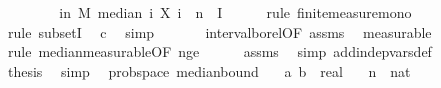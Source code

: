 \begin{isabellebody}
\ \ \isamarkupfalse%
\ \isamarkupfalse%
\ {\isachardoublequoteopen}{\isachardot}{\kern0pt}{\isachardot}{\kern0pt}{\isachardot}{\kern0pt}\ {\isasymle}\ {\isasymP}{\isacharparenleft}{\kern0pt}{\isasymomega}\ in\ M{\isachardot}{\kern0pt}\ median\ {\isacharparenleft}{\kern0pt}{\isasymlambda}i{\isachardot}{\kern0pt}\ X\ i\ {\isasymomega}{\isacharparenright}{\kern0pt}\ n\ {\isasymin}\ I{\isacharparenright}{\kern0pt}{\isachardoublequoteclose}\isanewline
\ \ \ \ \isamarkupfalse%
\ {\isacharparenleft}{\kern0pt}rule\ finite{\isacharunderscore}{\kern0pt}measure{\isacharunderscore}{\kern0pt}mono{\isacharparenright}{\kern0pt}\isanewline
\ \ \ \ \ \isamarkupfalse%
\ {\isacharparenleft}{\kern0pt}rule\ subsetI{\isacharparenright}{\kern0pt}\ \isamarkupfalse%
\ c\ \isamarkupfalse%
\ simp\ \isanewline
\ \ \ \ \isamarkupfalse%
\ interval{\isacharunderscore}{\kern0pt}borel{\isacharbrackleft}{\kern0pt}OF\ assms{\isacharparenleft}{\kern0pt}{}{\isacharparenright}{\kern0pt}{\isacharbrackright}{\kern0pt}\ \isamarkupfalse%
\ measurable\isanewline
\ \ \ \ \isamarkupfalse%
\ {\isacharparenleft}{\kern0pt}rule\ median{\isacharunderscore}{\kern0pt}measurable{\isacharbrackleft}{\kern0pt}OF\ n{\isacharunderscore}{\kern0pt}ge{\isacharunderscore}{\kern0pt}{}{\isacharbrackright}{\kern0pt}{\isacharparenright}{\kern0pt}\isanewline
\ \ \ \ \isamarkupfalse%
\ assms{\isacharparenleft}{\kern0pt}{}{\isacharparenright}{\kern0pt}\ \isamarkupfalse%
\ {\isacharparenleft}{\kern0pt}simp\ add{\isacharcolon}{\kern0pt}indep{\isacharunderscore}{\kern0pt}vars{\isacharunderscore}{\kern0pt}def{\isacharparenright}{\kern0pt}\isanewline
\ \ \isamarkupfalse%
\ \isamarkupfalse%
\ {\isacharquery}{\kern0pt}thesis\ \isamarkupfalse%
\ simp\isanewline
{}\isamarkupfalse%
%
\endisatagproof
{\isafoldproof}%
%
\isadelimproof
\isanewline
%
\endisadelimproof
\isanewline
{}\isamarkupfalse%
\ {\isacharparenleft}{\kern0pt}\ prob{\isacharunderscore}{\kern0pt}space{\isacharparenright}{\kern0pt}\ median{\isacharunderscore}{\kern0pt}bound{\isacharunderscore}{\kern0pt}{}{\isacharcolon}{\kern0pt}\isanewline
\ \ \ a\ b\ {\isacharcolon}{\kern0pt}{\isacharcolon}{\kern0pt}\ real\isanewline
\ \ \ n\ {\isacharcolon}{\kern0pt}{\isacharcolon}{\kern0pt}\ nat\isanewline
\ \ \ {\isachardoublequoteopen}{\isasymalpha}\ {\isachargreater}{\kern0pt}\ {}{\isachardoublequoteclose}\isanewline

\end{isabellebody}
